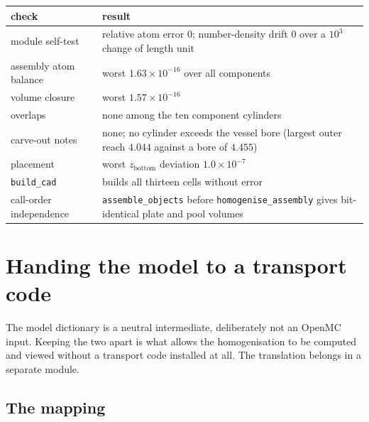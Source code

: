 \documentclass[9pt,a4paper]{extarticle}
\newcommand{\code}[1]{\texttt{\small #1}}
\begin{document}
\begin{center}
\begin{tabular}{@{}lp{9.4cm}@{}}
\toprule
check & result \\
\midrule
module self-test & relative atom error $0$; number-density drift $0$ over a
  $10^3$ change of length unit \\
assembly atom balance & worst $1.63\times10^{-16}$ over all components \\
volume closure & worst $1.57\times10^{-16}$ \\
overlaps & none among the ten component cylinders \\
carve-out notes & none; no cylinder exceeds the vessel bore
  (largest outer reach $4.044$ against a bore of $4.455$) \\
placement & worst $z_{\mathrm{bottom}}$ deviation $1.0\times10^{-7}$ \\
\code{build\_cad} & builds all thirteen cells without error \\
call-order independence & \code{assemble\_objects} before
  \code{homogenise\_assembly} gives bit-identical plate and pool volumes \\
\bottomrule
\end{tabular}
\end{center}

\section{Handing the model to a transport code}
\label{sec:openmc}

The model dictionary is a neutral intermediate, deliberately not an OpenMC
input. Keeping the two apart is what allows the homogenisation to be computed
and viewed without a transport code installed at all. The translation belongs in
a separate module.

\subsection{The mapping}
\end{document}
